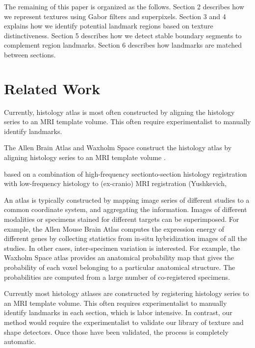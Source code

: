 \documentclass{llncs}
\begin{document}
The remaining of this paper is organized as the follows. Section 2 describes how we represent textures using Gabor filters and superpixels. Section 3 and 4 explains how we identify potential landmark regions based on texture distinctiveness. Section 5 describes how we detect stable boundary segments to complement region landmarks. Section 6 describes how landmarks are matched between sections.



\section{Related Work}


Currently, histology atlas is most often constructed by aligning the histology series to an MRI template volume. This often require experimentalist to manually identify landmarks.

The Allen Brain Atlas\cite{lein2007genome} and Waxholm Space \cite{lee2005standard} construct the histology atlas by aligning histology series to an MRI template volume \cite{yushkevich20063d}.


based on a combination of high-frequency sectionto-section
histology registration with low-frequency histology to (ex-cranio) MRI registration (Yushkevich, 


An atlas is typically constructed by mapping image series of different studies to a common coordinate system, and aggregating the information. 
Images of different modalities or specimens stained for different targets can be superimposed. For example, the Allen Mouse Brain Atlas\cite{lein2007genome} computes the expression energy of different genes by collecting statistics from in-situ hybridization images of all the studies. 
In other cases, inter-specimen variation is interested. For example, the Waxholm Space atlas\cite{lee2005standard} provides an anatomical probability map that gives the probability of each voxel belonging to a particular anatomical structure. The probabilities are computed from a large number of co-registered specimens.


Currently most histology atlases are constructed by registering histology series to an MRI template volume. This often requires experimentalist to manually identify landmarks in each section, which is labor intensive. 
In contrast, our method would require the experimentalist to validate our library of texture and shape detectors. Once those have been validated, the process is completely automatic.
\end{document}
